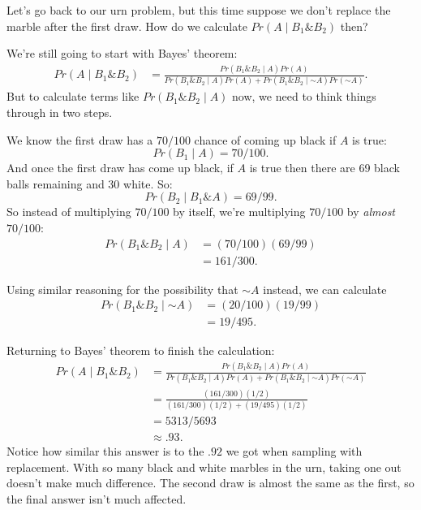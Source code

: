 \documentclass[justified]{tufte-book}
\newcommand{\given}{\mid}
\renewcommand{\neg}{\mathbin{\sim}}
\renewcommand{\wedge}{\mathbin{\&}}
\newcommand{\p}{Pr}
\theoremstyle{definition}
\theoremstyle{definition}
\theoremstyle{definition}
\theoremstyle{remark}
\begin{document}
Let's go back to our urn problem, but this time suppose we don't replace
the marble after the first draw. How do we calculate
\(\p(A \given B_1 \wedge B_2)\) then?

We're still going to start with Bayes' theorem: \[
  \begin{aligned}
    \p(A \given B_1 \wedge B_2) &= \frac{\p(B_1 \wedge B_2 \given A)\p(A)}{\p(B_1 \wedge B_2 \given A) \p(A) + \p(B_1 \wedge B_2 \given \neg A) \p(\neg A)}.
  \end{aligned}
\] But to calculate terms like \(\p(B_1 \wedge B_2 \given A)\) now, we
need to think things through in two steps.

We know the first draw has a \(70/100\) chance of coming up black if
\(A\) is true: \[ \p(B_1 \given A) = 70/100. \] And once the first draw
has come up black, if \(A\) is true then there are 69 black balls
remaining and 30 white. So: \[ \p(B_2 \given B_1 \wedge A) = 69/99. \]
So instead of multiplying \(70/100\) by itself, we're multiplying
\(70/100\) by \emph{almost} \(70/100\): \[
  \begin{aligned}
    \p(B_1 \wedge B_2 \given A) &= (70/100)(69/99)\\
       &= 161/300.
  \end{aligned}
\]

Using similar reasoning for the possibility that \(\neg A\) instead, we
can calculate \[
  \begin{aligned}
    \p(B_1 \wedge B_2 \given \neg A) &= (20/100)(19/99)\\
       &= 19/495.
  \end{aligned}
\]

Returning to Bayes' theorem to finish the calculation: \[
  \begin{aligned}
    \p(A \given B_1 \wedge B_2) &= \frac{\p(B_1 \wedge B_2 \given A)\p(A)}{\p(B_1 \wedge B_2 \given A) \p(A) + \p(B_1 \wedge B_2 \given \neg A) \p(\neg A)} \\
      &= \frac{(161/300)(1/2)}{(161/300)(1/2) + (19/495)(1/2)} \\
      &= 5313/5693 \\
      &\approx .93. 
  \end{aligned}
\] Notice how similar this answer is to the \(.92\) we got when sampling
with replacement. With so many black and white marbles in the urn,
taking one out doesn't make much difference. The second draw is almost
the same as the first, so the final answer isn't much affected.
\end{document}
